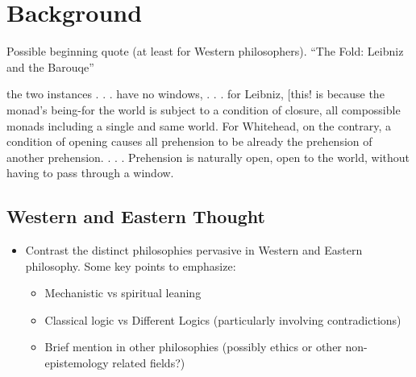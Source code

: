 \chapter{Background}
\label{ch:background}

Possible beginning quote (at least for Western philosophers). ``The Fold: Leibniz and the Barouqe''
\begin{displayquote}
the two instances . . . have no windows, . . . for Leibniz, [this! is because the monad’s being-for the world is subject to a condition of closure, all compossible monads including a single and same world. For Whitehead, on the contrary, a condition of opening causes all prehension to be already the prehension of another prehension. . . . Prehension is naturally open, open to the world, without having to pass through a window.
\end{displayquote}

\section{Western and Eastern Thought}

\begin{itemize}
  \item Contrast the distinct philosophies pervasive in Western and Eastern philosophy. Some key points to emphasize:
        \begin{itemize}
          \item Mechanistic vs spiritual leaning
          \item Classical logic vs Different Logics (particularly involving contradictions)
          \item Brief mention in other philosophies (possibly ethics or other non-epistemology related fields?)
        \end{itemize}
\end{itemize}

